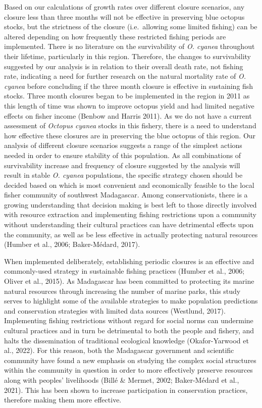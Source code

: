\documentclass[
]{article}
\begin{document}
Based on our calculations of growth rates over different closure scenarios, any closure less than three months will not be effective in preserving blue octopus stocks, but the strictness of the closure (i.e.~allowing some limited fishing) can be altered depending on how frequently these restricted fishing periods are implemented. There is no literature on the survivability of \emph{O. cyanea} throughout their lifetime, particularly in this region. Therefore, the changes to survivability suggested by our analysis is in relation to their overall death rate, not fishing rate, indicating a need for further research on the natural mortality rate of \emph{O. cyanea} before concluding if the three month closure is effective in sustaining fish stocks. Three month closures began to be implemented in the region in 2011 as this length of time was shown to improve octopus yield and had limited negative effects on fisher income (Benbow and Harris 2011). As we do not have a current assessment of \emph{Octopus cyanea} stocks in this fishery, there is a need to understand how effective these closures are in preserving the blue octopus of this region. Our analysis of different closure scenarios suggests a range of the simplest actions needed in order to ensure stability of this population. As all combinations of survivability increase and frequency of closure suggested by the analysis will result in stable \emph{O. cyanea} populations, the specific strategy chosen should be decided based on which is most convenient and economically feasible to the local fisher community of southwest Madagascar. Among conservationists, there is a growing understanding that decision making is best left to those directly involved with resource extraction and implementing fishing restrictions upon a community without understanding their cultural practices can have detrimental effects upon the community, as well as be less effective in actually protecting natural resources (Humber et al., 2006; Baker-Médard, 2017).

When implemented deliberately, establishing periodic closures is an effective and commonly-used strategy in sustainable fishing practices (Humber et al., 2006; Oliver et al., 2015). As Madagascar has been committed to protecting its marine natural resources through increasing the number of marine parks, this study serves to highlight some of the available strategies to make population predictions and conservation strategies with limited data sources (Westlund, 2017). Implementing fishing restrictions without regard for social norms can undermine cultural practices and in turn be detrimental to both the people and fishery, and halts the dissemination of traditional ecological knowledge (Okafor-Yarwood et al., 2022). For this reason, both the Madagascar government and scientific community have found a new emphasis on studying the complex social structures within the community in question in order to more effectively preserve resources along with peoples' livelihoods (Billé \& Mermet, 2002; Baker-Médard et al., 2021). This has been shown to increase participation in conservation practices, therefore making them more effective.
\end{document}
